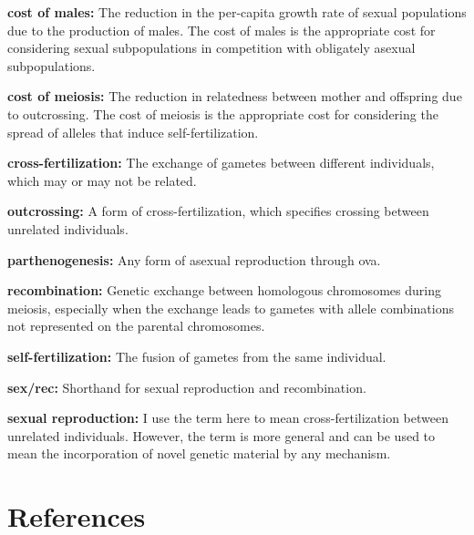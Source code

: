 \documentclass[
  american,
  letterpaper,
]{book}
\begin{document}
\textbf{cost of males:} The reduction in the per-capita growth rate of
sexual populations due to the production of males. The cost of males is
the appropriate cost for considering sexual subpopulations in
competition with obligately asexual subpopulations.

\textbf{cost of meiosis:} The reduction in relatedness between mother
and offspring due to outcrossing. The cost of meiosis is the appropriate
cost for considering the spread of alleles that induce
self-fertilization.

\textbf{cross-fertilization:} The exchange of gametes between different
individuals, which may or may not be related.

\textbf{outcrossing:} A form of cross-fertilization, which specifies
crossing between unrelated individuals.

\textbf{parthenogenesis:} Any form of asexual reproduction through ova.

\textbf{recombination:} Genetic exchange between homologous chromosomes
during meiosis, especially when the exchange leads to gametes with
allele combinations not represented on the parental chromosomes.

\textbf{self-fertilization:} The fusion of gametes from the same
individual.

\textbf{sex/rec:} Shorthand for sexual reproduction and recombination.

\textbf{sexual reproduction:} I use the term here to mean
cross-fertilization between unrelated individuals. However, the term is
more general and can be used to mean the incorporation of novel genetic
material by any mechanism.


\chapter*{References}\label{references}

\end{document}
